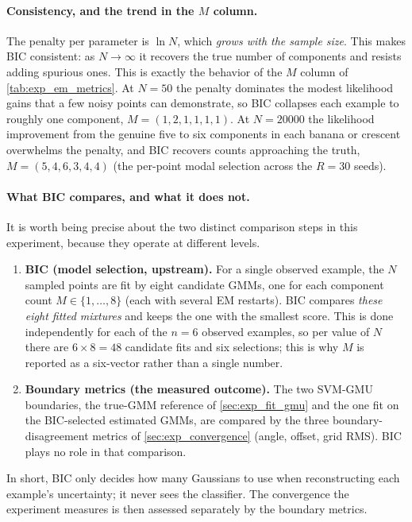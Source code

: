 \documentclass[11pt, letterpaper]{article}
\begin{document}
\paragraph{Consistency, and the trend in the $M$ column.} The penalty per parameter is $\ln N$, which \emph{grows with the sample size}. This makes BIC consistent: as $N \to \infty$ it recovers the true number of components and resists adding spurious ones. This is exactly the behavior of the $M$ column of \cref{tab:exp_em_metrics}. At $N = 50$ the penalty dominates the modest likelihood gains that a few noisy points can demonstrate, so BIC collapses each example to roughly one component, $M = (1, 2, 1, 1, 1, 1)$. At $N = 20000$ the likelihood improvement from the genuine five to six components in each banana or crescent overwhelms the penalty, and BIC recovers counts approaching the truth, $M = (5, 4, 6, 3, 4, 4)$ (the per-point modal selection across the $R = 30$ seeds).

\paragraph{What BIC compares, and what it does not.} It is worth being precise about the two distinct comparison steps in this experiment, because they operate at different levels.
\begin{enumerate}[leftmargin=2em]
    \item \textbf{BIC (model selection, upstream).} For a single observed example, the $N$ sampled points are fit by eight candidate GMMs, one for each component count $M \in \{1, \ldots, 8\}$ (each with several EM restarts). BIC compares \emph{these eight fitted mixtures} and keeps the one with the smallest score. This is done independently for each of the $n = 6$ observed examples, so per value of $N$ there are $6 \times 8 = 48$ candidate fits and six selections; this is why $M$ is reported as a six-vector rather than a single number.
    \item \textbf{Boundary metrics (the measured outcome).} The two SVM-GMU boundaries, the true-GMM reference of \cref{sec:exp_fit_gmu} and the one fit on the BIC-selected estimated GMMs, are compared by the three boundary-disagreement metrics of \cref{sec:exp_convergence} (angle, offset, grid RMS). BIC plays no role in that comparison.
\end{enumerate}
In short, BIC only decides how many Gaussians to use when reconstructing each example's uncertainty; it never sees the classifier. The convergence the experiment measures is then assessed separately by the boundary metrics.
\end{document}
